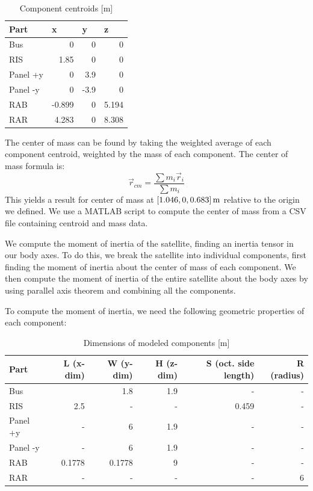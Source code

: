 \begin{longtable}{l|r|r|r}
\caption{Component centroids [m]}
\label{tab:centroid}\\
\textbf{Part} & \multicolumn{1}{l}{\textbf{x}} & \multicolumn{1}{l}{\textbf{y}} & \multicolumn{1}{l}{\textbf{z}} \\ \hline
\endfirsthead
%
\endhead
%
Bus      & 0     & 0    & 0    \\
RIS      & 1.85  & 0    & 0    \\
Panel +y & 0     & 3.9  & 0    \\
Panel -y & 0     & -3.9 & 0    \\
RAB      & -0.899 & 0    & 5.194 \\
RAR      & 4.283   & 0    & 8.308
\end{longtable}

The center of mass can be found by taking the weighted average of each component centroid, weighted by the mass of each component. The center of mass formula is:
\begin{equation*}
    \Vec{r}_{cm} = \frac{\sum m_{i} \Vec{r}_{i}}{\sum m_{i}}
\end{equation*}
This yields a result for center of mass at $\qty[parse-numbers = false]{[1.046, 0, 0.683]}{\metre}$ relative to the origin we defined. We use a MATLAB script to compute the center of mass from a CSV file containing centroid and mass data.

We compute the moment of inertia of the satellite, finding an inertia tensor in our body axes. To do this, we break the satellite into individual components, first finding the moment of inertia about the center of mass of each component. We then compute the moment of inertia of the entire satellite about the body axes by using parallel axis theorem and combining all the components.

To compute the moment of inertia, we need the following geometric properties of each component:

\begin{longtable}{l|r|r|r|r|r}
\caption{Dimensions of modeled components [m]}
\label{tab:dimensions}\\
\textbf{Part} & \textbf{L (x-dim)} & \textbf{W (y-dim)} & \textbf{H (z-dim)} & \textbf{S (oct. side length)} & \textbf{R (radius)} \\ \hline
\endfirsthead
%
\endhead
%
Bus &  & 1.8 & 1.9 & - & - \\
RIS & 2.5 & - & - & 0.459 & - \\
Panel +y & - & 6 & 1.9 & - & - \\
Panel -y & - & 6 & 1.9 & - & - \\
RAB & 0.1778 & 0.1778 & 9 & - & - \\
RAR & - & - & - & - & 6
\end{longtable}

